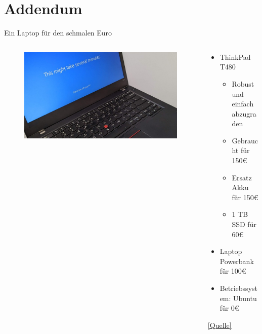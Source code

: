 
\section{Addendum}
\begin{frame}{Ein Laptop für den schmalen Euro}
    \begin{columns}
        \begin{column}{0.6\textwidth}
            \begin{figure}
                \begin{flushleft}
                    \includegraphics[width=\textwidth,trim={0 0 0 0},clip]{graphics/ThinkPad.jpg}
                \end{flushleft}                
            \end{figure} 
        \end{column}
        \begin{column}{0.4\textwidth}
            \begin{itemize}
                \item ThinkPad T480
                \begin{itemize}
                    \item Robust und einfach abzugraden
                    \item Gebraucht für 150€
                    \item Ersatz Akku für 150€
                    \item 1 TB SSD für 60€
                \end{itemize} 
                \item Laptop Powerbank für 100€
                \item Betriebssystem: Ubuntu für 0€
            \end{itemize}
            \href{https://www.golem.de/news/diy-mein-thinkpad-t480-ist-so-gut-wie-ein-macbook-air-m1-2308-176569.html}{[Quelle]}
        \end{column}
    \end{columns}
\end{frame}


